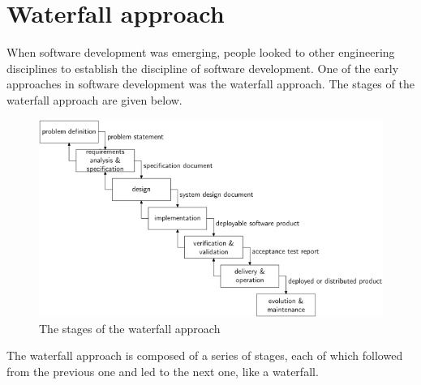 \documentclass[a4paper, openany]{memoir}
\begin{document}
\section{Waterfall approach}
When software development was emerging, people looked to other engineering disciplines to establish the discipline of software development. One of the early approaches in software development was the waterfall approach. The stages of the waterfall approach are given below.
\begin{figure}[H]
    \centering
    \includegraphics[scale=0.55]{src/1.3 Waterfall.png}
    \caption{The stages of the waterfall approach}
\end{figure}
\noindent The waterfall approach is composed of a series of stages, each of which followed from the previous one and led to the next one, like a waterfall.
\end{document}
